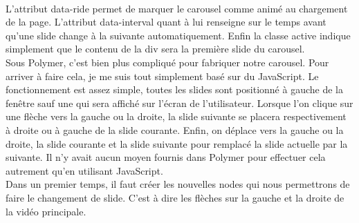 \documentclass{article}
\begin{document}
\vspace{0.5cm}\\ 
L'attribut \og data-ride \fg{} permet de marquer le carousel comme anim\'e au chargement de la page. L'attribut \og data-interval \fg{} quant \`a lui renseigne sur le temps avant qu'une slide change \`a la suivante automatiquement. Enfin la classe \og active \fg{} indique simplement que le contenu de la div sera la premi\`ere slide du carousel.\\
Sous Polymer, c'est bien plus compliqu\'e pour fabriquer notre carousel. Pour arriver \`a faire cela, je me suis tout simplement bas\'e sur du JavaScript. Le fonctionnement est assez simple, toutes les slides sont positionn\'e \`a gauche de la fen\^etre sauf une qui sera affich\'e sur l'\'ecran de l'utilisateur. Lorsque l'on clique sur une fl\`eche vers la gauche ou la droite, la slide suivante se placera respectivement \`a droite ou \`a gauche de la slide courante. Enfin, on d\'eplace vers la gauche ou la droite, la slide courante et la slide suivante pour remplac\'e la slide actuelle par la suivante. Il n'y avait aucun moyen fournis dans Polymer pour effectuer cela autrement qu'en utilisant JavaScript.\\
Dans un premier temps, il faut cr\'eer les nouvelles nodes qui nous permettrons de faire le changement de slide. C'est \`a dire les fl\`eches sur la gauche et la droite de la vid\'eo principale.
\vspace{0.5cm}\\
\end{document}
